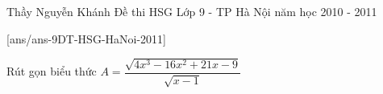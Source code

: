
\begin{name}
{Thầy Nguyễn Khánh}
{Đề thi HSG Lớp 9 - TP Hà Nội năm học 2010 - 2011}
\end{name}
\setcounter{ex}{0}
[ans/ans-9DT-HSG-HaNoi-2011]
\begin{ex}%
\hfill

Rút gọn biểu thức $A = \dfrac{\sqrt{4x^3 - 16x^2 + 21x - 9}}{\sqrt{x - 1}}$
\end{ex}






